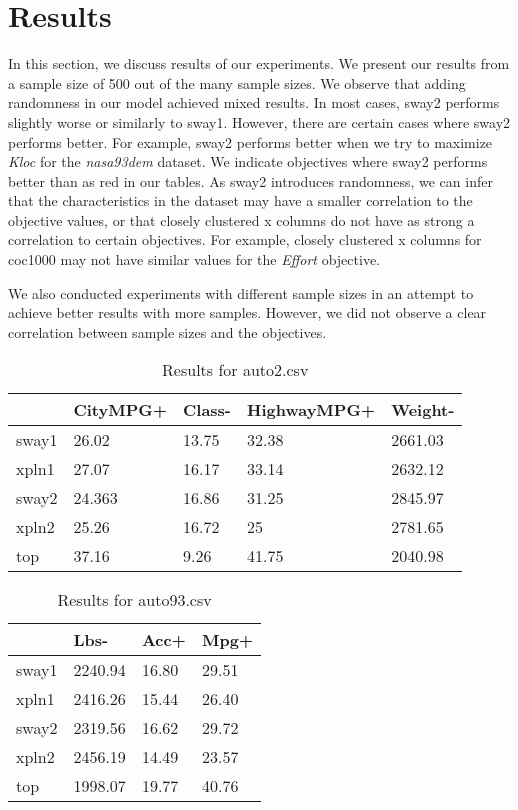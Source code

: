 \section{Results}
\label{sec:results}


In this section, we discuss results of our experiments. We present our
results from a sample size of 500 out of the many sample sizes. We
observe that adding randomness in our model achieved mixed results. In
most cases, sway2 performs slightly worse or similarly to sway1.
However, there are certain cases where sway2 performs better. For
example, sway2 performs better when we try to maximize \textit{Kloc} for
the \textit{nasa93dem} dataset. We indicate objectives where sway2
performs better than as red in our tables. As sway2 introduces
randomness, we can infer that the characteristics in the dataset may
have a smaller correlation to the objective values, or that closely
clustered x columns do not have as strong a correlation to certain
objectives. For example, closely clustered x columns for coc1000 may not
have similar values for the \textit{Effort} objective. 

We also conducted experiments with different sample sizes in an attempt
to achieve better results with more samples. However, we did not observe
a clear correlation between sample sizes and the objectives. 

\begin{table}[]
  \begin{center}
  \begin{tabular}{lllll}
          & CityMPG+      & Class-     & HighwayMPG+ & Weight-   \\
    \hline
    sway1 & 26.02         & 13.75      & 32.38       & 2661.03 \\
    xpln1 & 27.07         & 16.17      & 33.14       & 2632.12   \\
    sway2 & 24.363        & 16.86      & 31.25       & 2845.97   \\
    xpln2 & 25.26         & 16.72      & 25          & 2781.65   \\
    top   & 37.16         & 9.26       & 41.75       & 2040.98    
  \end{tabular}
  \end{center}
  \caption{Results for auto2.csv}
  \label{tab:auto2}
\end{table}


\begin{table}[]
  \begin{center}
  \begin{tabular}{llll}
        & Lbs-    & Acc+  & Mpg+  \\
  \hline
  sway1 & 2240.94 & 16.80 & 29.51 \\
  xpln1 & 2416.26 & 15.44 & 26.40 \\
  sway2 & 2319.56 & 16.62 & 29.72 \\
  xpln2 & 2456.19 & 14.49 & 23.57 \\
  top   & 1998.07 & 19.77 & 40.76
  \end{tabular}
\end{center}
  \caption{Results for auto93.csv}
  \label{tab:auto93}
\end{table}



